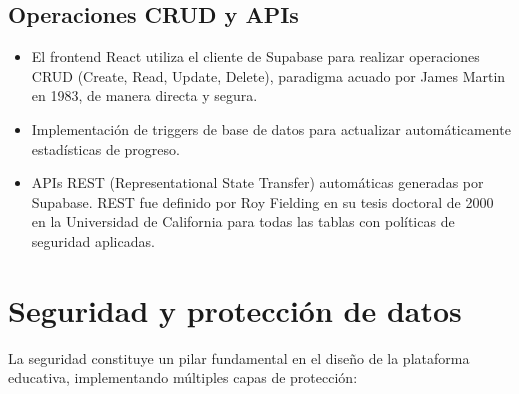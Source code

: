 \documentclass[12pt,a4paper]{report}
\begin{document}
\subsection{Operaciones CRUD y APIs}

\begin{itemize}
\item El frontend React utiliza el cliente de Supabase para realizar operaciones CRUD (Create, Read, Update, Delete), paradigma acuado por James Martin en 1983, de manera directa y segura.
\item Implementación de triggers de base de datos para actualizar automáticamente estadísticas de progreso.
\item APIs REST (Representational State Transfer) automáticas generadas por Supabase. REST fue definido por Roy Fielding en su tesis doctoral de 2000 en la Universidad de California para todas las tablas con políticas de seguridad aplicadas.
\end{itemize}

\section{Seguridad y protección de datos}

La seguridad constituye un pilar fundamental en el diseño de la plataforma educativa, implementando múltiples capas de protección:
\end{document}
